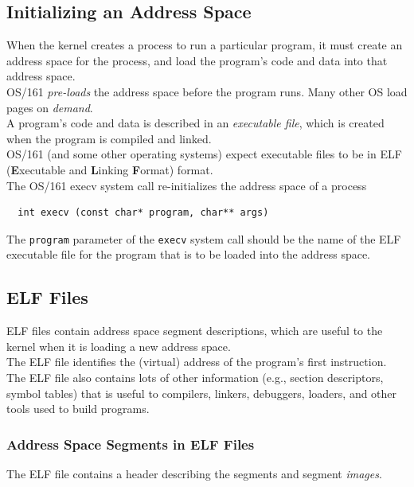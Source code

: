 \documentclass[12pt]{article}
\theoremstyle{plain}
\theoremstyle{definition}
\begin{document}
\subsection{Initializing an Address Space}
When the kernel creates a process to run a particular program, it must create an address space for the process, and load the program's code and data into that address space. \\
OS/161 \emph{pre-loads} the address space before the program runs.
Many other OS load pages on \emph{demand}. \\

A program's code and data is described in an \emph{executable file}, which is created when the program is compiled and linked. \\

OS/161 (and some other operating systems) expect executable files to be in ELF (\textbf{E}xecutable and \textbf{L}inking \textbf{F}ormat) format. \\

The OS/161 execv system call re-initializes the address space of a process
\begin{verbatim}
  int execv (const char* program, char** args)
\end{verbatim}

The \texttt{program} parameter of the \texttt{execv} system call should be the name of the ELF executable file for the program that is to be loaded into the address space.

\subsection{ELF Files}
ELF files contain address space segment descriptions, which are useful to the kernel when it is loading a new address space. \\

The ELF file identifies the (virtual) address of the program's first instruction. \\

The ELF file also contains lots of other information (e.g., section descriptors, symbol tables) that is useful to compilers, linkers, debuggers, loaders, and other tools used to build programs.

\subsubsection{Address Space Segments in ELF Files}
The ELF file contains a header describing the segments and segment \emph{images}. \\
\end{document}
